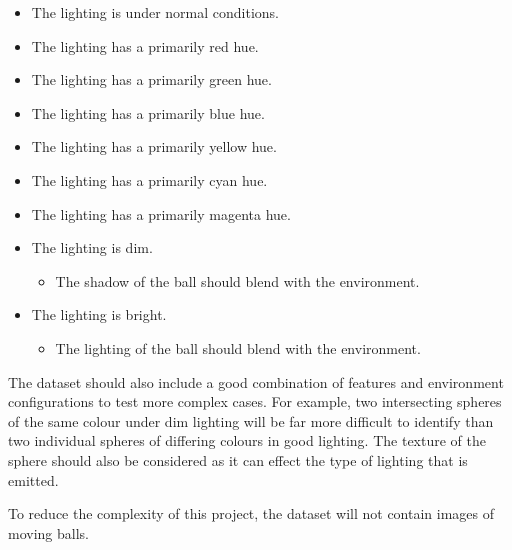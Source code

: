 \documentclass[11pt]{scrartcl}
\begin{document}
{{        	\begin{itemize}
        		\item The lighting is under normal conditions.
        		\item The lighting has a primarily red hue.
        		\item The lighting has a primarily green hue.
        		\item The lighting has a primarily blue hue.
        		\item The lighting has a primarily yellow hue.
        		\item The lighting has a primarily cyan hue.
        		\item The lighting has a primarily magenta hue.
        		\item The lighting is dim.
        		\begin{itemize}
        			\item The shadow of the ball should blend with the environment.
        		\end{itemize}
        		\item The lighting is bright.
        		\begin{itemize}
        			\item The lighting of the ball should blend with the environment.
        		\end{itemize}
        	\end{itemize}

        	The dataset should also include a good combination of features and
        	environment configurations to test more complex cases. For example, two
        	intersecting spheres of the same colour under dim lighting will be far 
        	more difficult to identify than two individual spheres of differing
        	colours in good lighting. The texture of the sphere should also be
        	considered as it can effect the type of lighting that is emitted.


            To reduce the complexity of this project, the dataset will not contain
            images of moving balls.

        }

	}
\end{document}
